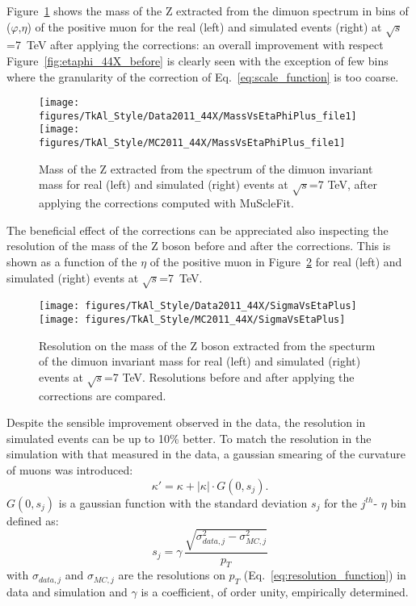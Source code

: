 Figure~\ref{fig:etaphi_44X_after} shows the 
mass of the Z extracted from the dimuon spectrum in bins of
($\varphi$,$\eta$) of the positive muon for the real (left) and simulated
events (right) at $\sqrt{s}$=7~TeV after applying the corrections: 
an overall improvement with respect Figure~\ref{fig:etaphi_44X_before}
is clearly seen with the exception of few bins where the granularity
of the correction of Eq.~\ref{eq:scale_function} is too coarse.
\begin{figure}[hbtp]  
\begin{center}
\texttt{[image: figures/TkAl\_Style/Data2011\_44X/MassVsEtaPhiPlus\_file1]}
\texttt{[image: figures/TkAl\_Style/MC2011\_44X/MassVsEtaPhiPlus\_file1]}
 \hspace{1cm} 
   \caption{Mass of the Z extracted from the spectrum of the dimuon
     invariant mass for real (left) and simulated (right) events at $\sqrt{s}$=7 TeV, after
     applying the corrections computed with MuScleFit.
   \label{fig:etaphi_44X_after}}
 \end{center}
\end{figure} 
The beneficial effect of the corrections can be appreciated also
inspecting the resolution of the mass of the Z boson before and after the
corrections. This is shown as a function of the $\eta$ of the positive
muon in Figure~\ref{fig:SigmaVsEta_44X} for real (left) and simulated (right) events 
at $\sqrt{s}$=7~TeV. 
\begin{figure}[hbtp]  
\begin{center}
\texttt{[image: figures/TkAl\_Style/Data2011\_44X/SigmaVsEtaPlus]}
\texttt{[image: figures/TkAl\_Style/MC2011\_44X/SigmaVsEtaPlus]}
 \hspace{1cm} 
   \caption{Resolution on the mass of the Z boson extracted from the specturm of the dimuon
     invariant mass for real (left) and simulated (right) events at
     $\sqrt{s}$=7 TeV. Resolutions before and after applying the
     corrections are compared.
   \label{fig:SigmaVsEta_44X}}
 \end{center}
\end{figure} 
Despite the sensible improvement observed in the
data, the resolution in simulated events can be up to 10\%
better. To match the resolution in the simulation with that
measured in the data, a gaussian smearing 
of the curvature of muons was introduced:
\begin{equation}
\kappa' = \kappa + |\kappa| \cdot G(0,s_j).
\label{eq:smearing}
\end{equation} 
$G(0,s_j)$ is a gaussian function with the standard
deviation $s_j$ for the $j^{th}$- $\eta$ bin defined  as:
\[
s_j = \gamma \, \frac{\sqrt{\sigma^2_{data,j}-\sigma^2_{MC,j}}}{p_T}
\] 
with $\sigma_{data,j}$ and $\sigma_{MC,j}$ are the resolutions on
$p_T$ (Eq.~\ref{eq:resolution_function}) in data and simulation and $\gamma$ is a
coefficient, of order unity, empirically determined. 

